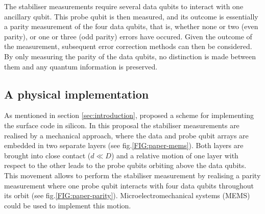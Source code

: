 The stabiliser measurements require several data qubits to interact with one ancillary qubit. This probe qubit is then measured, and its outcome is essentially a parity measurement of the four data qubits, that is, whether none or two  (even parity), or one or three (odd parity) errors have occured. Given the outcome of the measurement, subsequent error correction methods can then be considered. By only measuring the parity of the data qubits, no distinction is made between them and any quantum information is preserved. 






\subsection{A physical implementation} \label{sec:PhysicalImplementation}
As mentioned in section \ref{sec:introduction},  \citet{OGorman2016} proposed a scheme for implementing the surface code in silicon. In this proposal the stabiliser measurements are realised by a mechanical approach, where the data and probe qubit arrays are embedded in two separate layers (see fig.\@ \ref{FIG:paper-mems}). Both layers are brought into close contact ($d\ll D$) and a relative motion of one layer with respect to the other leads to the probe qubits orbiting above the data qubits. This movement allows to perform the stabiliser measurement by realising a parity measurement where one probe qubit interacts with four data qubits throughout its orbit (see fig.\@ \ref{FIG:paper-parity}). Microelectromechanical systems (MEMS) could be used to implement this motion.


